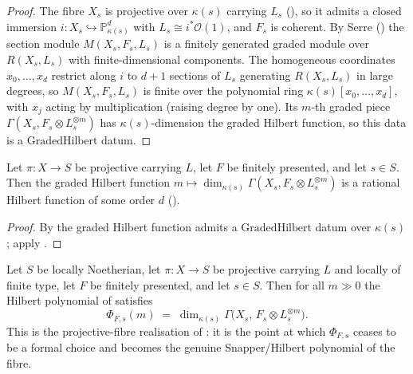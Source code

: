 \begin{proof}
  The fibre \(X_s\) is projective over \(\kappa(s)\) carrying \(L_s\)
  (), so it admits a closed immersion
  \(i : X_s \hookrightarrow \mathbb{P}^d_{\kappa(s)}\) with
  \(L_s \cong i^*\mathcal{O}(1)\), and \(F_s\) is coherent.  By Serre
  () the section module \(M(X_s, F_s, L_s)\) is
  a finitely generated graded module over \(R(X_s, L_s)\) with
  finite-dimensional components.  The homogeneous coordinates \(x_0, \dots, x_d\)
  restrict along \(i\) to \(d+1\) sections of \(L_s\) generating \(R(X_s, L_s)\)
  in large degrees, so \(M(X_s, F_s, L_s)\) is finite over the polynomial ring
  \(\kappa(s)[x_0, \dots, x_d]\), with \(x_j\) acting by multiplication (raising
  degree by one).  Its \(m\)-th graded piece \(\Gamma(X_s, F_s \otimes
  L_s^{\otimes m})\) has \(\kappa(s)\)-dimension the graded Hilbert function, so
  this data is a \(\mathrm{GradedHilbert}\) datum.
\end{proof}

\begin{lemma}
  \label{lem:hilbertFunction_isRatHilb}
  \leanok
  Let \(\pi : X \to S\) be projective carrying \(L\), let \(F\) be finitely
  presented, and let \(s \in S\).  Then the graded Hilbert function
  \(m \mapsto \dim_{\kappa(s)} \Gamma(X_s, F_s \otimes L_s^{\otimes m})\) is a
  rational Hilbert function of some order \(d\) ().
\end{lemma}

\begin{proof}
  By  the graded Hilbert function admits a
  \(\mathrm{GradedHilbert}\) datum over \(\kappa(s)\); apply
  .
\end{proof}

\begin{lemma}
  \label{lem:hilbertPolynomial_eval_eventually_of_projective}
  \leanok
  Let \(S\) be locally Noetherian, let \(\pi : X \to S\) be projective carrying
  \(L\) and locally of finite type, let \(F\) be finitely presented, and let
  \(s \in S\).  Then for all \(m \gg 0\) the Hilbert polynomial of
   satisfies
  \[
    \Phi_{F,s}(m) \;=\; \dim_{\kappa(s)}
      \Gamma\bigl(X_s,\, F_s \otimes L_s^{\otimes m}\bigr).
  \]
  This is the projective-fibre realisation of
  : it is the point at which
  \(\Phi_{F,s}\) ceases to be a formal choice and becomes the genuine
  Snapper/Hilbert polynomial of the fibre.
\end{lemma}

